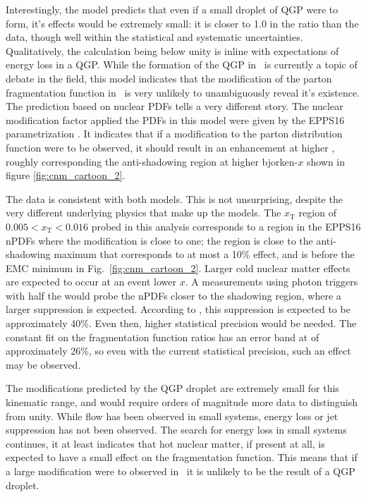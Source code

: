   Interestingly, the model predicts that even if a small droplet of QGP were to form, it's effects would be extremely small: it is closer to 1.0 in the ratio than the data, though well within the statistical and systematic uncertainties. Qualitatively, the calculation being below unity is inline with expectations of energy loss in a QGP. While the formation of the QGP in \pPb~is currently a topic of debate in the field, this model indicates that the modification of the parton fragmentation function in \pPb~is very unlikely to unambiguously reveal it's existence. The prediction based on nuclear PDFs tells a very different story. The nuclear modification factor applied the PDFs in this model were given by the EPPS16 parametrization \cite{Eskola2017a}. It indicates that if a modification to the parton distribution function were to be observed, it should result in an enhancement at higher \zt, roughly corresponding the anti-shadowing region at higher bjorken-$x$ shown in figure \ref{fig:cnm_cartoon_2}. 

  The data is consistent with both models. This is not unsurprising, despite the very different underlying physics that make up the models. The $x_\mathrm{T}$ region of  $0.005 < x_\mathrm{T} < 0.016$ probed in this analysis corresponds to a region in the EPPS16 nPDFs where the modification is close to one; the region is close to the anti-shadowing maximum that corresponds to at most a 10\% effect, and is before the EMC minimum in Fig.~\ref{fig:cnm_cartoon_2}. Larger cold nuclear matter effects are expected to occur at an event lower $x$. A measurements using photon triggers with half the \pt would probe the nPDFs closer to the shadowing region, where a larger suppression is expected. According to \cite{epps16:2017}, this suppression is expected to be approximately 40\%. Even then, higher statistical precision would be needed. The constant fit on the fragmentation function ratios has an error band at of approximately 26\%, so even with the current statistical precision, such an effect may be observed. 

  The modifications predicted by the QGP droplet are extremely small for this kinematic range, and would require orders of magnitude more data to distinguish from unity. While flow has been observed in small systems, energy loss or jet suppression has not been observed. The search for energy loss in small systems continues, it at least indicates that hot nuclear matter, if present at all, is expected to have a small effect on the fragmentation function. This means that if a large modification were to observed in \pPb~it is unlikely to be the result of a QGP droplet.


